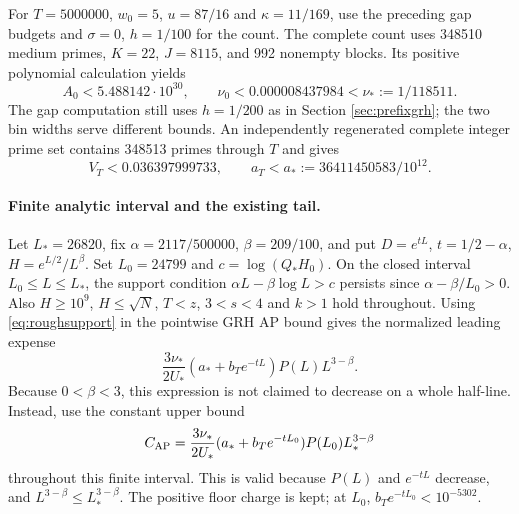 \documentclass[11pt]{article}
\begin{document}
For $T=5000000$, $w_0=5$, $u=87/16$ and $\kappa=11/169$,
use the preceding gap budgets and $\sigma=0$, $h=1/100$ for the count.
The complete count uses 348510 medium primes, $K=22$, $J=8115$,
and 992 nonempty blocks. Its positive polynomial calculation yields
\[
A_0<5.488142\cdot10^{30},\qquad
\nu_0<0.000008437984<\nu_*:=1/118511.
\]
The gap computation still uses $h=1/200$ as in Section \ref{sec:prefixgrh};
the two bin widths serve different bounds.
An independently regenerated complete integer prime set contains 348513
primes through $T$ and gives
\[
V_T<0.036397999733,\qquad
a_T<a_*:=36411450583/10^{12}.
\]

\paragraph{Finite analytic interval and the existing tail.}
Let $L_*=26820$, fix $\alpha=2117/500000$, $\beta=209/100$,
and put $D=e^{tL}$, $t=1/2-\alpha$, $H=e^{L/2}/L^\beta$.
Set $L_0=24799$ and $c=\log(Q_*H_0)$.
On the closed interval $L_0\le L\le L_*$, the support condition
$\alpha L-\beta\log L>c$ persists since
$\alpha-\beta/L_0>0$. Also $H\ge10^9$, $H\le\sqrt N$,
$T<z$, $3<s<4$ and $k>1$ hold throughout.
Using \eqref{eq:roughsupport} in the pointwise GRH AP bound gives the
normalized leading expense
\[
\frac{3\nu_*}{2U_*}(a_*+b_Te^{-tL})P(L)L^{3-\beta}.
\]
Because $0<\beta<3$, this expression is not claimed to decrease on a
whole half-line. Instead, use the constant upper bound
\begin{equation}\label{eq:intervalplateau}
C_{\rm AP}=\frac{3\nu_*}{2U_*}
(a_*+b_Te^{-tL_0})P(L_0)L_*^{3-\beta}
\end{equation}
throughout this finite interval. This is valid because $P(L)$ and
$e^{-tL}$ decrease, and $L^{3-\beta}\le L_*^{3-\beta}$.
The positive floor charge is kept; at $L_0$,
$b_Te^{-tL_0}<10^{-5302}$.
\end{document}
